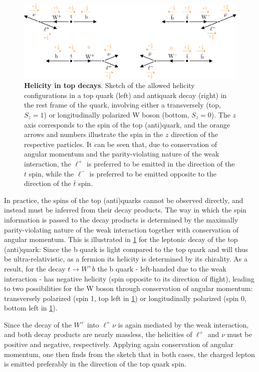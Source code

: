 \begin{figure}[t]
    \centering
    \includegraphics[width=0.95\linewidth]{figures/spin_corrs_sketch.pdf}
    \caption{\textbf{Helicity in top decays}. Sketch of the allowed helicity configurations in a top quark (left) and antiquark decay (right) in the rest frame of the quark, involving either a transversely (top, $S_z = 1$) or longitudinally polarized W boson (bottom, $S_z = 0$). The $z$ axis corresponds to the spin of the top (anti)quark, and the orange arrows and numbers illustrate the spin in the $z$ direction of the respective particles. It can be seen that, due to conservation of angular momentum and the parity-violating nature of the weak interaction, the $\ell^+$ is preferred to be emitted in the direction of the $t$ spin, while the $\ell^-$ is preferred to be emitted opposite to the direction of the $\bar{t}$ spin.}
    \label{fig:theory:topspin}
\end{figure}

In practice, the spins of the top (anti)quarks cannot be observed directly, and instead must be inferred from their decay products. The way in which the spin information is passed to the decay products is determined by the maximally parity-violating nature of the weak interaction together with conservation of angular momentum. This is illustrated in \cref{fig:theory:topspin} for the leptonic decay of the top (anti)quark: Since the b quark is light compared to the top quark and will thus be ultra-relativistic, as a fermion its helicity is determined by its chirality. As a result, for the decay $t \rightarrow W^+ b$ the b quark - left-handed due to the weak interaction - has negative helicity (spin opposite to its direction of flight), leading to two possibilities for the W boson through conservation of angular momentum: transversely polarized (spin 1, top left in \cref{fig:theory:topspin}) or longitudinally polarized (spin 0, bottom left in \cref{fig:theory:topspin}).

Since the decay of the $W^+$ into $\ell^+ \nu$ is again mediated by the weak interaction, and both decay products are nearly massless, the helicities of $\ell^+$ and $\nu$ must be positive and negative, respectively. Applying again conservation of angular momentum, one then finds from the sketch that in both cases, the charged lepton is emitted preferably in the direction of the top quark spin. 

